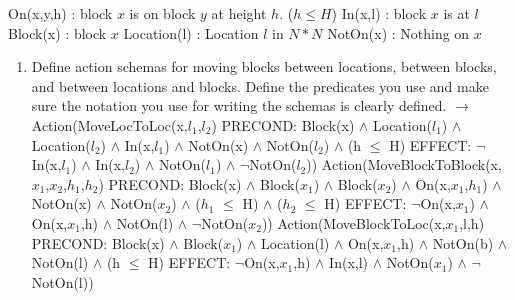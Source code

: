 \documentclass[10pt]{article}
\begin{document}
\begin{enumerate}
\newline
On(x,y,h) : block $x$ is on block $y$ at height $h$. ($h \leq H$) \newline
In(x,l) : block $x$ is at $l$ \newline
Block(x) : block $x$ \newline
Location(l) : Location $l$ in $N * N$ \newline
NotOn(x) : Nothing on $x$ \newline
\begin{enumerate}
\item Define action schemas for moving blocks between locations, between blocks, and between locations and blocks. Define the predicates you use and make sure the notation you use for writing the schemas is clearly defined. \newline
$\rightarrow$ \newline
Action(MoveLocToLoc(x,$l_1$,$l_2$) \newline
\hspace*{1.0cm} PRECOND: Block(x) $\wedge$ Location($l_1$) $\wedge$ Location($l_2$) $\wedge$ In(x,$l_1$) $\wedge$ NotOn(x) $\wedge$ NotOn($l_2$) $\wedge$ (h $\leq$ H) \newline
\hspace*{1.0cm} EFFECT: $\neg$In(x,$l_1$) $\wedge$ In(x,$l_2$) $\wedge$ NotOn($l_1$) $\wedge$ $\neg$NotOn($l_2$)) \newline
\newline
Action(MoveBlockToBlock(x,$x_1$,$x_2$,$h_1$,$h_2$) \newline
\hspace*{1.0cm} PRECOND: Block(x) $\wedge$ Block($x_1$) $\wedge$ Block($x_2$) $\wedge$ On(x,$x_1$,$h_1$) $\wedge$ NotOn(x) $\wedge$ NotOn($x_2$) $\wedge$ ($h_1$ $\leq$ H) $\wedge$ ($h_2$ $\leq$ H) \newline
\hspace*{1.0cm} EFFECT: $\neg$On(x,$x_1$) $\wedge$ On(x,$x_1$,h) $\wedge$ NotOn(l) $\wedge$ $\neg$NotOn($x_2$)) \newline
\newline
Action(MoveBlockToLoc(x,$x_1$,l,h) \newline
\hspace*{1.0cm} PRECOND: Block(x) $\wedge$ Block($x_1$) $\wedge$ Location(l) $\wedge$ On(x,$x_1$,h) $\wedge$ NotOn(b) $\wedge$ NotOn(l) $\wedge$ (h $\leq$ H) \newline
\hspace*{1.0cm} EFFECT: $\neg$On(x,$x_1$,h) $\wedge$ In(x,l) $\wedge$ NotOn($x_1$) $\wedge$ $\neg$NotOn(l)) \newline

\end{enumerate}
\end{enumerate}
\end{document}
